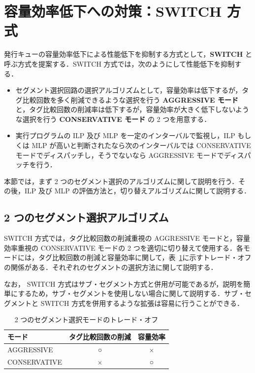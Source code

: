 \documentclass[submit,techrep,noauthor]{ipsj}
\newcommand{\tab}[1]{{表~\ref{tab:#1}}}
\begin{document}
\section{容量効率低下への対策：SWITCH 方式}
\label{sec:switch}
発行キューの容量効率低下による性能低下を抑制する方式として，\textbf{SWITCH} と呼ぶ方式を提案する．SWITCH 方式では，次のようにして性能低下を抑制する．
\begin{itemize}
  \item セグメント選択回路の選択アルゴリズムとして，容量効率は低下するが，タグ比較回数を多く削減できるような選択を行う \textbf{AGGRESSIVE モード} と，タグ比較回数の削減率は低下するが，容量効率が大きく低下しないような選択を行う \textbf{CONSERVATIVE モード} の 2 つを用意する．
  \item 実行プログラムの ILP 及び MLP を一定のインターバルで監視し，ILP もしくは MLP が高いと判断されたなら次のインターバルでは CONSERVATIVE モードでディスパッチし，そうでないなら AGGRESSIVE モードでディスパッチを行う．
\end{itemize}

本節では，まず 2 つのセグメント選択のアルゴリズムに関して説明を行う．その後，ILP 及び MLP の評価方法と，切り替えアルゴリズムに関して説明する．

\subsection{2 つのセグメント選択アルゴリズム}
SWITCH 方式では，タグ比較回数の削減重視の AGGRESSIVE モードと，容量効率重視の CONSERVATIVE モードの 2 つを適切に切り替えて使用する．各モードには，タグ比較回数の削減と容量効率に関して，\tab{switch_trade_off}に示すトレード・オフの関係がある．それぞれのセグメントの選択方法に関して説明する．

なお， SWITCH 方式はサブ・セグメント方式と併用が可能であるが，説明を簡単にするため，サブ・セグメントを使用しない場合に関して説明する．サブ・セグメントと SWITCH 方式を併用するような拡張は容易に行うことができる．

\begin{table}[tb]
  \caption{2 つのセグメント選択モードのトレード・オフ}
  \footnotesize
  \center
   \begin{tabular}{l|c|c} \hline \hline
   モード & タグ比較回数の削減 & 容量効率 \\ \hline
   AGGRESSIVE & ○ & × \\
   CONSERVATIVE & × & ○ \\ \hline
  \end{tabular}
  \label{tab:switch_trade_off}
\end{table}
\end{document}
